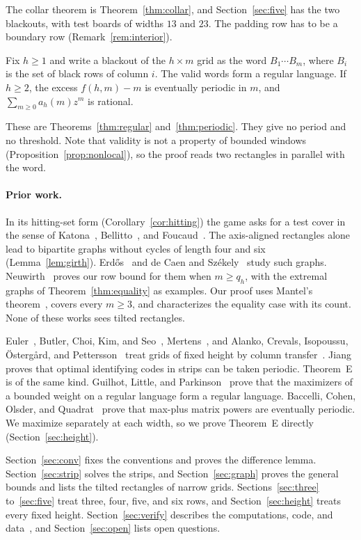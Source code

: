 The collar theorem is Theorem~\ref{thm:collar}, and Section~\ref{sec:five} has the two
blackouts, with test boards of widths $13$ and $23$. The padding row has to be a boundary
row (Remark~\ref{rem:interior}).

\begin{thmE}
Fix $h\ge1$ and write a blackout of the $h\times m$ grid as the word $B_1\cdots B_m$,
where $B_i$ is the set of black rows of column $i$. The valid words form a regular
language. If $h\ge2$, the excess $f(h,m)-m$ is eventually periodic in $m$, and
$\sum_{m\ge0}a_h(m)z^m$ is rational.
\end{thmE}

These are Theorems~\ref{thm:regular} and~\ref{thm:periodic}. They give no period and no
threshold. Note that validity is not a property of bounded windows
(Proposition~\ref{prop:nonlocal}), so the proof reads two rectangles in parallel with the
word.

\paragraph{Prior work.} In its hitting-set form (Corollary~\ref{cor:hitting}) the game
asks for a test cover in the sense of Katona~\cite{katona1966}, Bellitto~\cite{bellitto2018},
and Foucaud~\cite[Section~1.1]{foucaud2015}. The axis-aligned rectangles alone lead to
bipartite graphs without cycles of length four and six (Lemma~\ref{lem:girth}).
Erd\H{o}s~\cite{erdos1080} and de Caen and Sz\'ekely~\cite{decaenszekely1997} study such
graphs. Neuwirth~\cite[Theorem~1 and Proposition~17]{neuwirth2001} proves our row bound
for them when $m\ge q_h$, with the extremal graphs of Theorem~\ref{thm:equality} as
examples. Our proof uses Mantel's theorem~\cite{mantel1907}, covers every $m\ge3$, and
characterizes the equality case with its count. None of these works
sees tilted rectangles.

Euler~\cite{euler2005}, Butler, Choi, Kim, and Seo~\cite{butler2019},
Mertens~\cite{mertens2024}, and Alanko, Crevals, Isopoussu, \"Osterg\r{a}rd, and
Pettersson~\cite{alanko2011} treat grids of fixed height by column
transfer~\cite[Proposition~V.6]{flajolet2009}. Jiang~\cite{jiang2018} proves that optimal
identifying codes in strips can be taken periodic. Theorem~E is of the same kind.
Guilhot, Little, and Parkinson~\cite[Theorem~1]{glp2025} prove that the maximizers of a
bounded weight on a regular language form a regular language. Baccelli, Cohen, Olsder,
and Quadrat~\cite{baccelli1992} prove that max-plus matrix powers are eventually
periodic. We maximize separately at each width, so we prove Theorem~E directly
(Section~\ref{sec:height}).

Section~\ref{sec:conv} fixes the conventions and proves the difference lemma.
Section~\ref{sec:strip} solves the strips, and Section~\ref{sec:graph} proves the general
bounds and lists the tilted rectangles of narrow grids. Sections~\ref{sec:three}
to~\ref{sec:five} treat three, four, five, and six rows, and Section~\ref{sec:height}
treats every fixed height. Section~\ref{sec:verify} describes the computations, code, and
data~\cite{repo}, and Section~\ref{sec:open} lists open questions.
